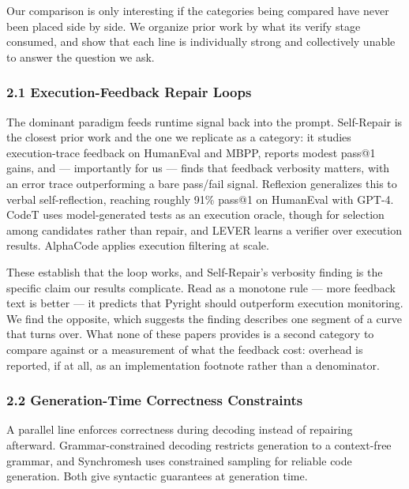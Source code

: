 
Our comparison is only interesting if the categories being compared have never been placed side by side. We organize prior work by what its verify stage consumed, and show that each line is individually strong and collectively unable to answer the question we ask.

\subsubsection{2.1 Execution-Feedback Repair Loops}

The dominant paradigm feeds runtime signal back into the prompt. Self-Repair \citep{Olausson2023SelfRepair} is the closest prior work and the one we replicate as a category: it studies execution-trace feedback on HumanEval and MBPP, reports modest pass@1 gains, and --- importantly for us --- finds that feedback verbosity matters, with an error trace outperforming a bare pass/fail signal. Reflexion \citep{Shinn2023Reflexion} generalizes this to verbal self-reflection, reaching roughly 91\% pass@1 on HumanEval with GPT-4. CodeT \citep{Chen2022CodeT} uses model-generated tests as an execution oracle, though for selection among candidates rather than repair, and LEVER \citep{Ni2023LEVER} learns a verifier over execution results. AlphaCode \citep{Li2022AlphaCode} applies execution filtering at scale.

These establish that the loop works, and Self-Repair's verbosity finding is the specific claim our results complicate. Read as a monotone rule --- more feedback text is better --- it predicts that Pyright should outperform execution monitoring. We find the opposite, which suggests the finding describes one segment of a curve that turns over. What none of these papers provides is a second category to compare against or a measurement of what the feedback cost: overhead is reported, if at all, as an implementation footnote rather than a denominator.

\subsubsection{2.2 Generation-Time Correctness Constraints}

A parallel line enforces correctness during decoding instead of repairing afterward. Grammar-constrained decoding \citep{Geng2023Grammar} restricts generation to a context-free grammar, and Synchromesh \citep{Poesia2021Synchromesh} uses constrained sampling for reliable code generation. Both give syntactic guarantees at generation time.

